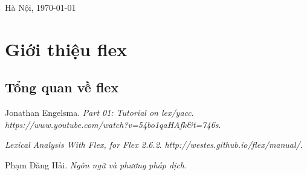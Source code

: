 \documentclass[14pt,a4paper]{extreport}
\begin{document}
\vspace{1cm}
\begin{center}
	
	{\fontsize{17pt}{1}\selectfont Hà Nội, \today}
\end{center}




\newpage
\thispagestyle{empty}
\tableofcontents 
\newpage
\setlength{\parindent}{4em}
\setlength{\parskip}{1em}
\renewcommand{\baselinestretch}{1.5}


\chapter{Giới thiệu flex}
\section{Tổng quan về flex}

\begin{thebibliography}{9}
	Jonathan Engelsma.
	\textit{Part 01: Tutorial on lex/yacc}. 
	\textit{https://www.youtube.com/watch?v=54bo1qaHAfk\&t=746s}.
	
	
	\textit{Lexical Analysis With Flex, for Flex 2.6.2}.  
	\textit{http://westes.github.io/flex/manual/}.
	
	
	Phạm Đăng Hải.  
	\textit{Ngôn ngữ và phương pháp dịch}.  

	
	
	
\end{thebibliography}
\end{document}
